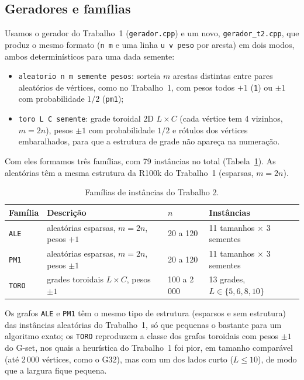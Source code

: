 

\subsection{Geradores e famílias}

Usamos o gerador do Trabalho~1 (\texttt{gerador.cpp}) e um novo, \texttt{gerador\_t2.cpp}, que produz o mesmo formato (\texttt{n m} e uma linha \texttt{u v peso} por aresta) em dois modos, ambos determinísticos para uma dada semente:
\begin{itemize}
  \item \texttt{aleatorio n m semente pesos}: sorteia $m$ arestas distintas entre pares aleatórios de vértices, como no Trabalho~1, com pesos todos $+1$ (\texttt{1}) ou $\pm1$ com probabilidade $1/2$ (\texttt{pm1});
  \item \texttt{toro L C semente}: grade toroidal 2D $L\times C$ (cada vértice tem 4 vizinhos, $m=2n$), pesos $\pm1$ com probabilidade $1/2$ e rótulos dos vértices embaralhados, para que a estrutura de grade não apareça na numeração.
\end{itemize}
Com eles formamos três famílias, com 79 instâncias no total (Tabela~\ref{tab:familias}). As aleatórias têm a mesma estrutura da R100k do Trabalho~1 (esparsas, $m=2n$).

\begin{table}[ht]\centering\footnotesize
\caption{Famílias de instâncias do Trabalho 2.}\label{tab:familias}
\begin{tabular}{llll}\toprule
Família & Descrição & $n$ & Instâncias\\\midrule
\texttt{ALE} & aleatórias esparsas, $m=2n$, pesos $+1$ & 20 a 120 & 11 tamanhos $\times$ 3 sementes\\
\texttt{PM1} & aleatórias esparsas, $m=2n$, pesos $\pm1$ & 20 a 120 & 11 tamanhos $\times$ 3 sementes\\
\texttt{TORO} & grades toroidais $L\times C$, pesos $\pm1$ & 100 a 2\,000 & 13 grades, $L\in\{5,6,8,10\}$\\\bottomrule
\end{tabular}
\end{table}

Os grafos \texttt{ALE} e \texttt{PM1} têm o mesmo tipo de estrutura (esparsos e sem estrutura) das instâncias aleatórias do Trabalho~1, só que pequenas o bastante para um algoritmo exato; os \texttt{TORO} reproduzem a classe dos grafos toroidais com pesos $\pm1$ do G-set, nos quais a heurística do Trabalho~1 foi pior, em tamanho comparável (até 2\,000 vértices, como o G32), mas com um dos lados curto ($L\le10$), de modo que a largura fique pequena.

